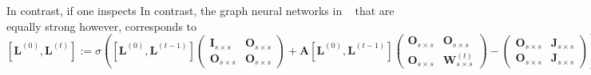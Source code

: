 In contrast, if one inspects
In contrast, the graph neural networks in ~\cite{grohewl} that are equally strong
however, corresponds to
$$
$$
$$
[\mathbf{L}^{(0)},\mathbf{L}^{(t)}]:=\sigma\left([\mathbf{L}^{(0)},\mathbf{L}^{(t-1)}]\begin{pmatrix}
\mathbf{I}_{s\times s} & \mathbf{O}_{s\times s}\\
\mathbf{O}_{s\times s} & \mathbf{O}_{s\times s}\end{pmatrix}
+\mathbf{A}[\mathbf{L}^{(0)},\mathbf{L}^{(t-1)}]
\begin{pmatrix}
\mathbf{O}_{s\times s} & \mathbf{O}_{s\times s}\\
\mathbf{O}_{s\times s} & \mathbf{W}_{s\times s}^{(t)}\end{pmatrix}-
\begin{pmatrix}
\mathbf{O}_{s\times s} & \mathbf{J}_{s\times s}\\
\mathbf{O}_{s\times s} & \mathbf{J}_{s\times s}\end{pmatrix}
\right).
$$
